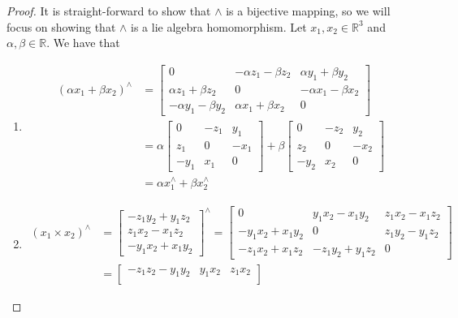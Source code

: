 \documentclass[a4paper]{article}
\begin{document}
\begin{proof}
  It is straight-forward to show that $\wedge$ is a bijective mapping, so we will focus on showing that $\wedge$ is a lie algebra homomorphism. Let $x_1,x_2 \in \mathds{R}^3$ and $\alpha, \beta \in \mathds{R}$. We have that
  \begin{enumerate}
    \item \[
        \begin{aligned}
          (\alpha x_1 + \beta x_2)^{\wedge} &= 
      \begin{bmatrix}
        0 & -\alpha z_1 - \beta z_2 & \alpha y_1 + \beta y_2 \\
        \alpha z_1 + \beta z_2 & 0 & -\alpha x_1 - \beta x_2 \\
        -\alpha y_1 - \beta y_2 & \alpha x_1 + \beta x_2 & 0
      \end{bmatrix} \\ 
      &=\alpha \begin{bmatrix}
        0 & -z_1 & y_1 \\
        z_1 & 0 & -x_1 \\
        -y_1 & x_1 & 0
      \end{bmatrix} +
      \beta \begin{bmatrix}
        0 & -z_2 & y_2 \\
        z_2 & 0 & -x_2 \\
        -y_2 & x_2 & 0
      \end{bmatrix} \\
      &= \alpha x_1^{\wedge} + \beta x_2^{\wedge}
        \end{aligned}
  \]
    \item
      \[
        \begin{aligned}
        (x_1 \times x_2)^{\wedge} &= 
        \begin{bmatrix}
        -z_1y_2 + y_1z_2 \\  
        z_1x_2 - x_1z_2 \\
        -y_1x_2 + x_1y_2
      \end{bmatrix}^{\wedge} =
      \begin{bmatrix}
        0 & y_1x_2 - x_1y_2 & z_1x_2 - x_1z_2 \\
        -y_1x_2 + x_1y_2 & 0 & z_1y_2 - y_1z_2 \\
        -z_1x_2 + x_1z_2 & -z_1y_2 + y_1z_2 & 0
      \end{bmatrix} \\
      &= 
      \begin{bmatrix}
        -z_1z_2 -y_1y_2 & y_1x_2 & z_1x_2 \\

\end{bmatrix}
\end{aligned}\]
\end{enumerate}
\end{proof}
\end{document}

